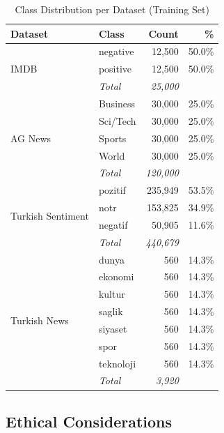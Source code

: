 \documentclass[conference]{IEEEtran}
\begin{document}
\begin{table}[htbp]
	\caption{Class Distribution per Dataset (Training Set)}
	\label{tab:class_dist}
	\begin{center}
		\footnotesize
		\renewcommand{\arraystretch}{1.2}
		\setlength{\tabcolsep}{6pt}
		\begin{tabular}{llrr}
			\toprule
			\rowcolor{headerblue}
			\color{white}\textbf{Dataset} & \color{white}\textbf{Class} & \color{white}\textbf{Count} & \color{white}\textbf{\%} \\
			\midrule
			\multirow{3}{*}{IMDB}
			  & negative  & 12,500 & 50.0\% \\
			  & positive  & 12,500 & 50.0\% \\
			  & \textit{Total} & \textit{25,000} & \\
			\midrule
			\multirow{5}{*}{AG News}
			  & Business  & 30,000 & 25.0\% \\
			  & Sci/Tech  & 30,000 & 25.0\% \\
			  & Sports    & 30,000 & 25.0\% \\
			  & World     & 30,000 & 25.0\% \\
			  & \textit{Total} & \textit{120,000} & \\
			\midrule
			\multirow{4}{*}{Turkish Sentiment}
			  & pozitif   & 235,949 & 53.5\% \\
			  & notr      & 153,825 & 34.9\% \\
			  & negatif   &  50,905 & 11.6\% \\
			  & \textit{Total} & \textit{440,679} & \\
			\midrule
			\multirow{8}{*}{Turkish News}
			  & dunya     & 560 & 14.3\% \\
			  & ekonomi   & 560 & 14.3\% \\
			  & kultur    & 560 & 14.3\% \\
			  & saglik    & 560 & 14.3\% \\
			  & siyaset   & 560 & 14.3\% \\
			  & spor      & 560 & 14.3\% \\
			  & teknoloji & 560 & 14.3\% \\
			  & \textit{Total} & \textit{3,920} & \\
			\bottomrule
		\end{tabular}
	\end{center}
\end{table}

\subsection{Ethical Considerations}
\end{document}
